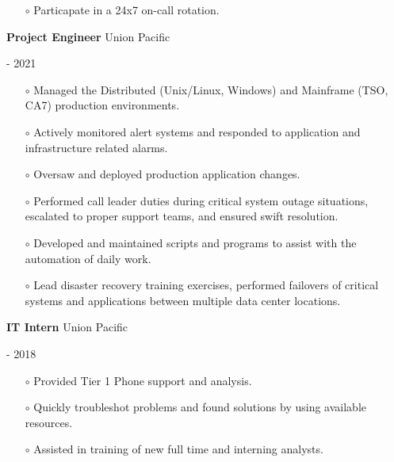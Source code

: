 \documentclass[10pt, a4paper]{article}
\begin{document}
\begin{itemize}[leftmargin=0cm]
\begin{itemize}[leftmargin=0cm]
        \item[$\circ$] Particapate in a 24x7 on-call rotation.
    \end{itemize}
    \begin{minipage}{0.5\textwidth} %
        \raggedright %
        \item \textbf{Project Engineer} Union Pacific
    \end{minipage}
    \begin{minipage}{0.5\textwidth} %
         \-- 2021
    \end{minipage}
    \begin{itemize}[leftmargin=0cm]
        \item[$\circ$] Managed the Distributed (Unix/Linux, Windows) and Mainframe (TSO, CA7) production environments.
        \item[$\circ$] Actively monitored alert systems and responded to application and infrastructure related alarms.
        \item[$\circ$] Oversaw and deployed production application changes.
        \item[$\circ$] Performed call leader duties during critical system outage situations, escalated to proper support teams, and ensured swift resolution.
        \item[$\circ$] Developed and maintained scripts and programs to assist with the automation of daily work.
        \item[$\circ$] Lead disaster recovery training exercises, performed failovers of critical systems and applications between multiple data center locations.
    \end{itemize}
    \begin{minipage}{0.5\textwidth} %
        \raggedright %
        \item \textbf{IT Intern} Union Pacific
    \end{minipage}
    \begin{minipage}{0.5\textwidth} %
         \-- 2018
    \end{minipage}
    \begin{itemize}[leftmargin=0cm]
        \item[$\circ$] Provided Tier 1 Phone support and analysis.
        \item[$\circ$] Quickly troubleshot problems and found solutions by using available resources.
        \item[$\circ$] Assisted in training of new full time and interning analysts.
    \end{itemize}
\end{itemize}
\end{document}
